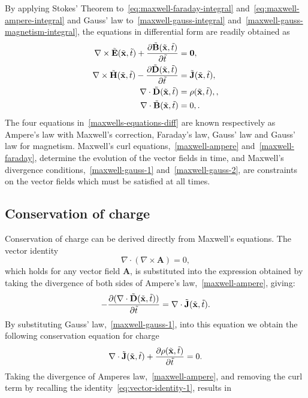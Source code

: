 By applying Stokes' Theorem to~\eqref{eq:maxwell-faraday-integral} and~\eqref{eq:maxwell-ampere-integral} and Gauss' law to~\eqref{maxwell-gauss-integral} and~\eqref{maxwell-gauss-magnetism-integral}, the equations in differential form are readily obtained as
\begin{subequations}
\label{maxwells-equations-diff}
\begin{align}
    \nabla \times \tilde{\mathbf{E}}(\tilde{\mathbf{x}},\tilde{t}) + \frac{\partial\tilde{\mathbf{B}}(\tilde{\mathbf{x}}, \tilde{t})}{\partial \tilde{t}}&= \mathbf{0}, \label{maxwell-faraday} \\
    \nabla \times \tilde{\mathbf{H}}(\tilde{\mathbf{x}},\tilde{t}) - \frac{\partial\tilde{\mathbf{D}}(\tilde{\mathbf{x}}, \tilde{t})}{\partial \tilde{t}}&= \tilde{\mathbf{J}}(\tilde{\mathbf{x}},\tilde{t}), \label{maxwell-ampere} \\
    \nabla \cdot \tilde{\mathbf{D}} (\tilde{\mathbf{x}},\tilde{t}) &= \rho(\tilde{\mathbf{x}},\tilde{t}), \label{maxwell-gauss-1}, \\
    \nabla \cdot \tilde{\mathbf{B}} (\tilde{\mathbf{x}},\tilde{t}) &= 0, \label{maxwell-gauss-2} .
\end{align}
\end{subequations}
The four equations in~\eqref{maxwells-equations-diff} are known respectively as Ampere's law with Maxwell's correction, Faraday's law, Gauss' law and Gauss' law for magnetism. Maxwell's curl equations,~\eqref{maxwell-ampere} and~\eqref{maxwell-faraday}, determine the evolution of the vector fields in time, and Maxwell's divergence conditions,~\eqref{maxwell-gauss-1} and~\eqref{maxwell-gauss-2}, are constraints on the vector fields which must be satisfied at all times.

\subsection{Conservation of charge}

Conservation of charge can be derived directly from Maxwell's equations. The vector identity
\begin{equation}
\label{eq:vector-identity-1}
\nabla \cdot ( \nabla \times \mathbf{A} ) = 0,
\end{equation}
which holds for any vector field $\mathbf{A}$, is substituted into the expression obtained by taking the divergence of both sides of Ampere's law,~\eqref{maxwell-ampere}, giving:
$$
- \frac{\partial( \nabla \cdot \tilde{\mathbf{D}}(\tilde{\mathbf{x}},\tilde{t}) ) }{\partial \tilde{t}} = \nabla \cdot \tilde{\mathbf{J}}(\tilde{\mathbf{x}},\tilde{t}) .
$$
By substituting Gauss' law,~\eqref{maxwell-gauss-1}, into this equation we obtain the following conservation equation for charge
\begin{equation}
\label{eq:maxwell-charge-conservation-2}
\nabla \cdot \tilde{\mathbf{J}}(\tilde{\mathbf{x}},\tilde{t}) + \frac{\partial\rho (\tilde{\mathbf{x}},\tilde{t}) }{\partial \tilde{t}} = 0 .
\end{equation}
Taking the divergence of Amperes law,~\eqref{maxwell-ampere}, and removing the curl term by recalling the identity~\eqref{eq:vector-identity-1}, results in

